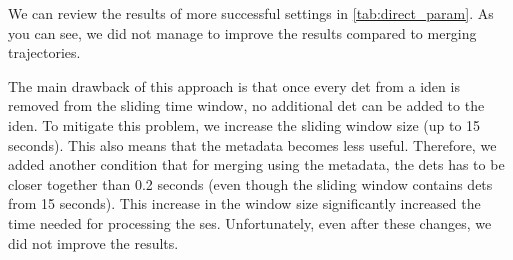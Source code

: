We can review the results of more successful settings in \autoref{tab:direct_param}. As you can see, we did not manage to improve the results compared to merging trajectories.

The main drawback of this approach is that once every \gls{det} from a \gls{iden} is removed from the sliding time window, no additional \gls{det} can be added to the \gls{iden}. To mitigate this problem, we increase the sliding window size (up to 15 seconds). This also means that the metadata becomes less useful. Therefore, we added another condition that for merging using the metadata, the \glspl{det} has to be closer together than 0.2 seconds (even though the sliding window contains \glspl{det} from 15 seconds). This increase in the window size significantly increased the time needed for processing the \gls{ses}. Unfortunately, even after these changes, we did not improve the results.








